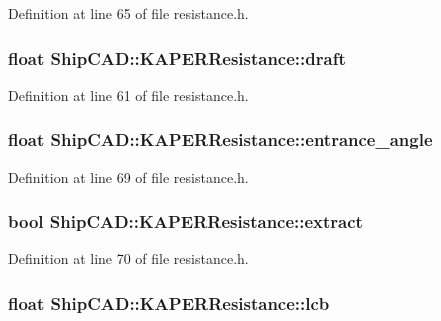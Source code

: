 Definition at line 65 of file resistance.\-h.

\hypertarget{structShipCAD_1_1KAPERResistance_a0be8d3ba3d4e485abe71c462575b478a}{
\subsubsection[{draft}]{\setlength{\rightskip}{0pt plus 5cm}float Ship\-C\-A\-D\-::\-K\-A\-P\-E\-R\-Resistance\-::draft}}\label{structShipCAD_1_1KAPERResistance_a0be8d3ba3d4e485abe71c462575b478a}


Definition at line 61 of file resistance.\-h.

\hypertarget{structShipCAD_1_1KAPERResistance_a941bc6efce4bc30f542cae5c68218aee}{
\subsubsection[{entrance\-\_\-angle}]{\setlength{\rightskip}{0pt plus 5cm}float Ship\-C\-A\-D\-::\-K\-A\-P\-E\-R\-Resistance\-::entrance\-\_\-angle}}\label{structShipCAD_1_1KAPERResistance_a941bc6efce4bc30f542cae5c68218aee}


Definition at line 69 of file resistance.\-h.

\hypertarget{structShipCAD_1_1KAPERResistance_a61ce222b79ad3964b278f5239dd2618f}{
\subsubsection[{extract}]{\setlength{\rightskip}{0pt plus 5cm}bool Ship\-C\-A\-D\-::\-K\-A\-P\-E\-R\-Resistance\-::extract}}\label{structShipCAD_1_1KAPERResistance_a61ce222b79ad3964b278f5239dd2618f}


Definition at line 70 of file resistance.\-h.

\hypertarget{structShipCAD_1_1KAPERResistance_a3b351285dc50665147ce987e0744b314}{
\subsubsection[{lcb}]{\setlength{\rightskip}{0pt plus 5cm}float Ship\-C\-A\-D\-::\-K\-A\-P\-E\-R\-Resistance\-::lcb}}\label{structShipCAD_1_1KAPERResistance_a3b351285dc50665147ce987e0744b314}


